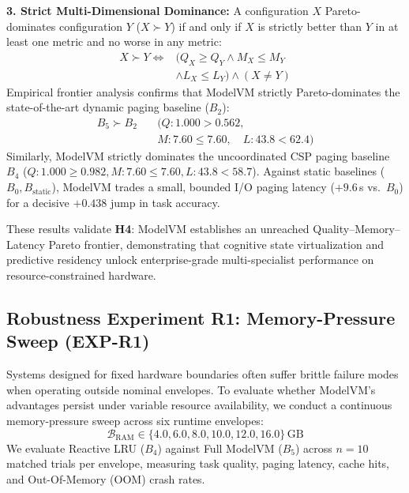 \textbf{3. Strict Multi-Dimensional Dominance:} A configuration $X$ Pareto-dominates configuration $Y$ ($X \succ Y$) if and only if $X$ is strictly better than $Y$ in at least one metric and no worse in any metric:
\begin{equation}
\begin{aligned}
X \succ Y \iff &(Q_X \ge Q_Y \land M_X \le M_Y \\
&\land L_X \le L_Y) \land (X \neq Y)
\end{aligned}
\end{equation}
Empirical frontier analysis confirms that ModelVM strictly Pareto-dominates the state-of-the-art dynamic paging baseline ($B_2$):
\begin{equation}
\begin{aligned}
B_5 \succ B_2 \quad &(Q: 1.000 > 0.562, \\
&M: 7.60 \le 7.60, \quad L: 43.8 < 62.4)
\end{aligned}
\end{equation}
Similarly, ModelVM strictly dominates the uncoordinated CSP paging baseline $B_4$ ($Q: 1.000 \ge 0.982, M: 7.60 \le 7.60, L: 43.8 < 58.7$). Against static baselines ($B_0, B_{\text{static}}$), ModelVM trades a small, bounded I/O paging latency ($+9.6$\,s vs.\ $B_0$) for a decisive $+0.438$ jump in task accuracy.

These results validate \textbf{H4}: ModelVM establishes an unreached Quality--Memory--Latency Pareto frontier, demonstrating that cognitive state virtualization and predictive residency unlock enterprise-grade multi-specialist performance on resource-constrained hardware.

\subsection{Robustness Experiment R1: Memory-Pressure Sweep (EXP-R1)}
\label{sec:results_r1}

Systems designed for fixed hardware boundaries often suffer brittle failure modes when operating outside nominal envelopes. To evaluate whether ModelVM's advantages persist under variable resource availability, we conduct a continuous memory-pressure sweep across six runtime envelopes:
\begin{equation}
\mathcal{B}_{\text{RAM}} \in \{4.0, 6.0, 8.0, 10.0, 12.0, 16.0\}\,\text{GB}
\end{equation}
We evaluate Reactive LRU ($B_4$) against Full ModelVM ($B_5$) across $n=10$ matched trials per envelope, measuring task quality, paging latency, cache hits, and Out-Of-Memory (OOM) crash rates.

